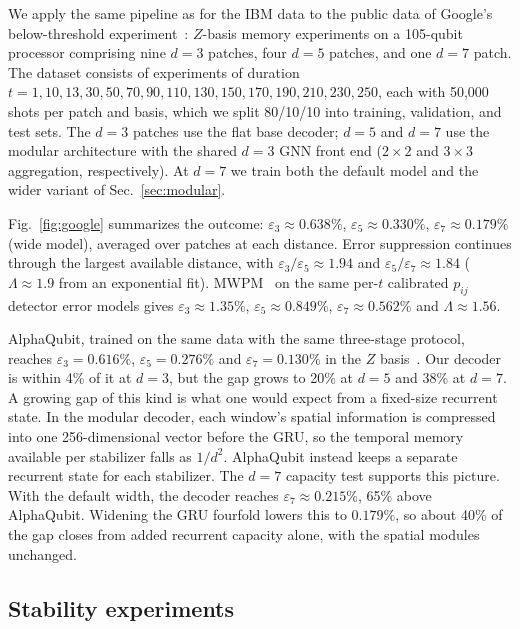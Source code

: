 \documentclass[aps,prxquantum,twocolumn,superscriptaddress,nofootinbib]{revtex4-2}
\begin{document}
We apply the same pipeline as for the IBM data to the public data of Google's below-threshold experiment~\cite{google2024threshold}: $Z$-basis memory experiments on a 105-qubit processor comprising nine $d=3$ patches, four $d=5$ patches, and one $d=7$ patch. The dataset consists of experiments of duration $t = 1, 10, 13, 30, 50, 70, 90, 110, 130, 150, 170, 190, 210, 230, 250$, each with 50{,}000 shots per patch and basis, which we split 80/10/10 into training, validation, and test sets. The $d=3$ patches use the flat base decoder; $d=5$ and $d=7$ use the modular architecture with the shared $d=3$ GNN front end ($2\times 2$ and $3\times 3$ aggregation, respectively). At $d=7$ we train both the default model and the wider variant of Sec.~\ref{sec:modular}.

Fig.~\ref{fig:google} summarizes the outcome: $\varepsilon_3 \approx 0.638\%$, $\varepsilon_5 \approx 0.330\%$, $\varepsilon_7 \approx 0.179\%$ (wide model), averaged over patches at each distance. Error suppression continues through the largest available distance, with $\varepsilon_3/\varepsilon_5 \approx 1.94$ and $\varepsilon_5 /\varepsilon_7 \approx 1.84$ ($\Lambda \approx 1.9$ from an exponential fit). MWPM~\cite{higgott2023sparse} on the same per-$t$ calibrated $p_{ij}$ detector error models gives $\varepsilon_3 \approx 1.35\%$, $\varepsilon_5 \approx 0.849\%$, $\varepsilon_7 \approx 0.562\%$ and $\Lambda \approx 1.56$.

AlphaQubit, trained on the same data with the same three-stage protocol, reaches $\varepsilon_3 = 0.616\%$, $\varepsilon_5 = 0.276\%$ and $\varepsilon_7 = 0.130\%$ in the $Z$ basis~\cite{google2024threshold}. Our decoder is within 4\% of it at $d=3$, but the gap grows to 20\% at $d=5$ and 38\% at $d=7$. A growing gap of this kind is what one would expect from a fixed-size recurrent state. In the modular decoder, each window's spatial information is compressed into one 256-dimensional vector before the GRU, so the temporal memory available per stabilizer falls as $1/d^2$. AlphaQubit instead keeps a separate recurrent state for each stabilizer. The $d=7$ capacity test supports this picture. With the default width, the decoder reaches $\varepsilon_7 \approx 0.215\%$, 65\% above AlphaQubit. Widening the GRU fourfold lowers this to $0.179\%$, so about 40\% of the gap closes from added recurrent capacity alone, with the spatial modules unchanged.

\subsection{Stability experiments}
\label{sec:stability}
\end{document}
